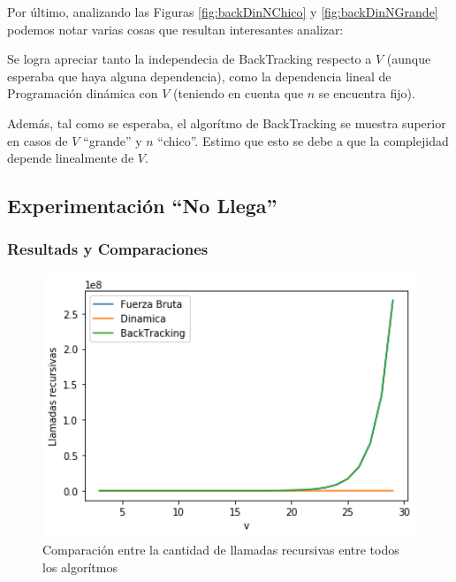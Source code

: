 \par Por \'ultimo, analizando las Figuras \ref{fig:backDinNChico} y \ref{fig:backDinNGrande} podemos notar varias cosas que 
resultan interesantes analizar:
\par Se logra apreciar tanto la independecia de BackTracking respecto a $V$ 
(aunque esperaba que haya alguna dependencia), como la dependencia lineal de Programaci\'on din\'amica con $V$ (teniendo
en cuenta que $n$ se encuentra fijo).
\par Adem\'as, tal como se esperaba, el algor\'itmo de BackTracking se muestra superior en casos de $V$ ``grande'' y 
$n$ ``chico''.
Estimo que esto se debe a que la complejidad depende linealmente de $V$.


\subsection{Experimentaci\'on ``No Llega''}
\subsubsection{Resultads y Comparaciones}

\begin{figure}[H] 
    \centering
    \begin{minipage}{0.45\textwidth}
        \centering
        \includegraphics[width=1\textwidth]{img/nollega/todosllamadas.png} %
        \caption{Comparaci\'on entre la cantidad de llamadas recursivas entre todos los algor\'itmos}
        \label{fig:todosllamadasnollega} 
    \end{minipage}\hfill
\end{figure}

